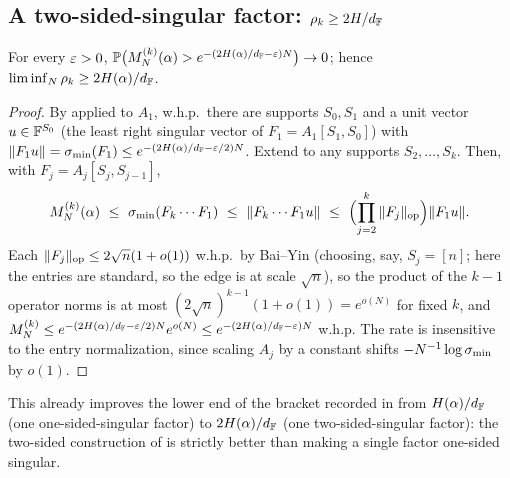 \subsection{A two-sided-singular factor: $\rho_k\ge 2H/d_{\mathbb{F}}$}
\begin{proposition}\label{prop:prod-lower}
For every $\varepsilon>0$, $\mathbb{P}\bigl(M_N^{(k)}(\alpha)>e^{-(2H(\alpha)/d_{\mathbb{F}}-\varepsilon)N}\bigr)\to0$; hence
$\liminf_N\rho_k\ge2H(\alpha)/d_{\mathbb{F}}$.
\end{proposition}
\begin{proof}
By  applied to $A_1$, w.h.p.\ there are supports $S_0,S_1$ and a unit vector
$u\in\mathbb{F}^{S_0}$ (the least right singular vector of $F_1=A_1[S_1,S_0]$) with
$\|F_1u\|=\sigma_{\min}(F_1)\le e^{-(2H(\alpha)/d_{\mathbb{F}}-\varepsilon/2)N}$. Extend to any supports $S_2,\dots,S_k$. Then, with
$F_j=A_j[S_j,S_{j-1}]$,
\[
  M_N^{(k)}(\alpha)\ \le\ \sigma_{\min}(F_k\cdots F_1)\ \le\ \|F_k\cdots F_1u\|\ \le\
  \Bigl(\prod_{j=2}^k\|F_j\|_{\mathrm{op}}\Bigr)\|F_1u\|.
\]
Each $\|F_j\|_{\mathrm{op}}\le 2\sqrt n(1+o(1))$ w.h.p.\ by Bai--Yin (choosing, say, $S_j=[n]$; here the entries
are standard, so the edge is at scale $\sqrt n$), so the product of the $k-1$ operator norms is at most
$(2\sqrt n)^{k-1}(1+o(1))=e^{o(N)}$ for fixed $k$, and
$M_N^{(k)}\le e^{-(2H(\alpha)/d_{\mathbb{F}}-\varepsilon/2)N}e^{o(N)}\le e^{-(2H(\alpha)/d_{\mathbb{F}}-\varepsilon)N}$ w.h.p. The rate is
insensitive to the entry normalization, since scaling $A_j$ by a constant shifts $-N^{-1}\log\sigma_{\min}$ by
$o(1)$.
\end{proof}

This already improves the lower end of the bracket recorded in \cite{shmaloProducts} from $H(\alpha)/d_{\mathbb{F}}$
(one one-sided-singular factor) to $2H(\alpha)/d_{\mathbb{F}}$ (one two-sided-singular factor): the two-sided
construction of \Cref{app:twosided} is strictly better than making a single factor one-sided singular.

